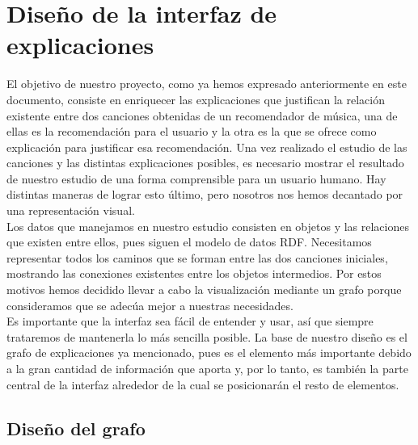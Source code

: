 \chapter{Diseño de la interfaz de explicaciones}
\label{cap:interfaz}

El objetivo de nuestro proyecto, como ya hemos expresado anteriormente en este documento, consiste en enriquecer las explicaciones que justifican la relación existente entre dos canciones obtenidas de un recomendador de música, una de ellas es la recomendación para el usuario y la otra es la que se ofrece como explicación para justificar esa recomendación. Una vez realizado el estudio de las canciones y las distintas explicaciones posibles, es necesario mostrar el resultado de nuestro estudio de una forma comprensible para un usuario humano. Hay distintas maneras de lograr esto último, pero nosotros nos hemos decantado por una representación visual.\\

Los datos que manejamos en nuestro estudio consisten en objetos y las relaciones que existen entre ellos, pues siguen el modelo de datos RDF. Necesitamos representar todos los caminos que se forman entre las dos canciones iniciales, mostrando las conexiones existentes entre los objetos intermedios. Por estos motivos hemos decidido llevar a cabo la visualización mediante un grafo porque consideramos que se adecúa mejor a nuestras necesidades.\\

Es importante que la interfaz sea fácil de entender y usar, así que siempre trataremos de mantenerla lo más sencilla posible. La base de nuestro diseño es el grafo de explicaciones ya mencionado, pues es el elemento más importante debido a la gran cantidad de información que aporta y, por lo tanto, es también la parte central de la interfaz alrededor de la cual se posicionarán el resto de elementos.\\

\section{Diseño del grafo}

